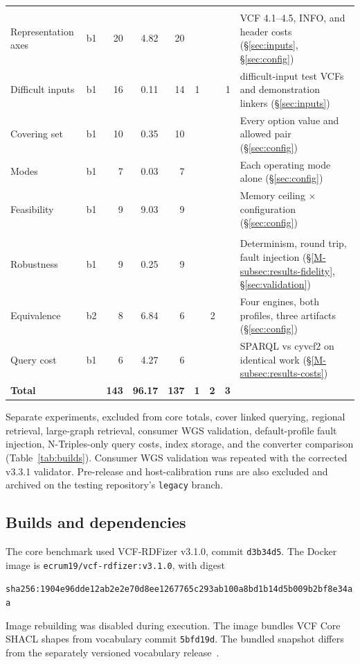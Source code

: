 \documentclass[11pt]{article}
\begin{document}
\begin{table}[!htbp]
\begin{tabularx}{\textwidth}{@{}l c r r r r r r >{\raggedright\arraybackslash}X@{}}
\addlinespace[3pt]
\multicolumn{9}{@{}l}{\textit{Input and configuration coverage}}\\
Representation axes & b1 & 20 & 4.82 & 20 &  &  &  & VCF 4.1--4.5, INFO, and header costs (\S\ref{sec:inputs}, \S\ref{sec:config})\\
Difficult inputs & b1 & 16 & 0.11 & 14 & 1 &  & 1 & 11 difficult-input test VCFs and demonstration linkers (\S\ref{sec:inputs})\\
Covering set & b1 & 10 & 0.35 & 10 &  &  &  & Every option value and allowed pair (\S\ref{sec:config})\\
Modes & b1 & 7 & 0.03 & 7 &  &  &  & Each operating mode alone (\S\ref{sec:config})\\
Feasibility & b1 & 9 & 9.03 & 9 &  &  &  & Memory ceiling $\times$ configuration (\S\ref{sec:config})\\
\addlinespace[3pt]
\multicolumn{9}{@{}l}{\textit{Validation and retrieval}}\\
Robustness & b1 & 9 & 0.25 & 9 &  &  &  & Determinism, round trip, fault injection (\S\ref{M-subsec:results-fidelity}, \S\ref{sec:validation})\\
Equivalence & b2 & 8 & 6.84 & 6 &  & 2 &  & Four engines, both profiles, three artifacts (\S\ref{sec:config})\\
Query cost & b1 & 6 & 4.27 & 6 &  &  &  & SPARQL vs cyvcf2 on identical work (\S\ref{M-subsec:results-costs})\\
\midrule
\textbf{Total} & & \textbf{143} & \textbf{96.17} & \textbf{137} & \textbf{1} & \textbf{2} & \textbf{3} & \\
\bottomrule
\end{tabularx}
\end{table}

Separate experiments, excluded from core totals, cover linked querying, regional retrieval, large-graph retrieval, consumer WGS validation, default-profile fault injection, N-Triples-only query costs, index storage, and the converter comparison (Table~\ref{tab:builds}).
Consumer WGS validation was repeated with the corrected v3.3.1 validator.
Pre-release and host-calibration runs are also excluded and archived on the testing repository's \texttt{legacy} branch.

\subsection{Builds and dependencies}\label{subsec:repro-builds}
The core benchmark used VCF-RDFizer v3.1.0, commit \texttt{d3b34d5}.
The Docker image is \texttt{ecrum19/vcf-rdfizer:v3.1.0}, with digest
\begin{center}\footnotesize\texttt{sha256:1904e96dde12ab2e2e70d8ee1267765c293ab100a8bd1b14d5b009b2bf8e34aa}\end{center}
Image rebuilding was disabled during execution.
The image bundles VCF Core SHACL shapes from vocabulary commit \texttt{5bfd19d}.
The bundled snapshot differs from the separately versioned vocabulary release~\cite{vcfc210}.
\end{document}
